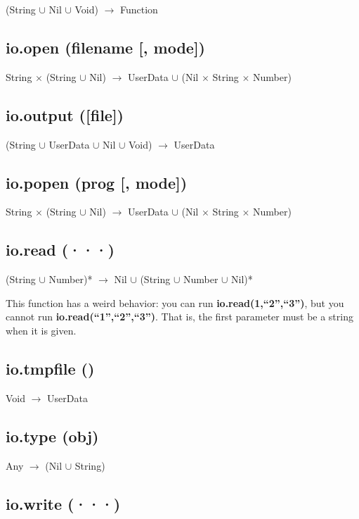 \documentclass[12pt]{article}
\begin{document}
(String $\cup$ Nil $\cup$ Void) $\rightarrow$ Function

\subsection{io.open (filename [, mode])}

String $\times$ (String $\cup$ Nil) $\rightarrow$
UserData $\cup$ (Nil $\times$ String $\times$ Number)

\subsection{io.output ([file])}

(String $\cup$ UserData $\cup$ Nil $\cup$ Void) $\rightarrow$
UserData

\subsection{io.popen (prog [, mode])}

String $\times$ (String $\cup$ Nil) $\rightarrow$
UserData $\cup$ (Nil $\times$ String $\times$ Number)

\subsection{io.read (···)}

(String $\cup$ Number)* $\rightarrow$
Nil $\cup$ (String $\cup$ Number $\cup$ Nil)* 

This function has a weird behavior: you can run 
\textbf{io.read(1,``2'',``3'')}, but you cannot run 
\textbf{io.read(``1'',``2'',``3'')}.
That is, the first parameter must be a string when it is given.

\subsection{io.tmpfile ()}

Void $\rightarrow$ UserData

\subsection{io.type (obj)}

Any $\rightarrow$
(Nil $\cup$ String)

\subsection{io.write (···)}
\end{document}
